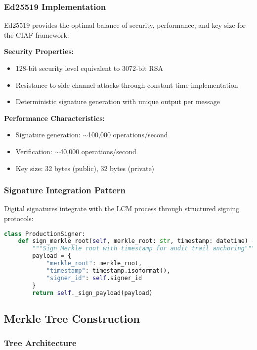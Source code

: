 \documentclass[12pt,a4paper]{article}
\begin{document}
\subsubsection{Ed25519 Implementation}

Ed25519 provides the optimal balance of security, performance, and key size for the CIAF framework:

\textbf{Security Properties:}
\begin{itemize}
\item 128-bit security level equivalent to 3072-bit RSA
\item Resistance to side-channel attacks through constant-time implementation
\item Deterministic signature generation with unique output per message
\end{itemize}

\textbf{Performance Characteristics:}
\begin{itemize}
\item Signature generation: $\sim$100,000 operations/second
\item Verification: $\sim$40,000 operations/second
\item Key size: 32 bytes (public), 32 bytes (private)
\end{itemize}

\subsubsection{Signature Integration Pattern}

Digital signatures integrate with the LCM process through structured signing protocols:

\begin{lstlisting}[language=Python, caption=Production Signature Integration]
class ProductionSigner:
    def sign_merkle_root(self, merkle_root: str, timestamp: datetime) -> str:
        """Sign Merkle root with timestamp for audit trail anchoring"""
        payload = {
            "merkle_root": merkle_root,
            "timestamp": timestamp.isoformat(),
            "signer_id": self.signer_id
        }
        return self._sign_payload(payload)
\end{lstlisting}

\subsection{Merkle Tree Construction}

\subsubsection{Tree Architecture}
\end{document}
